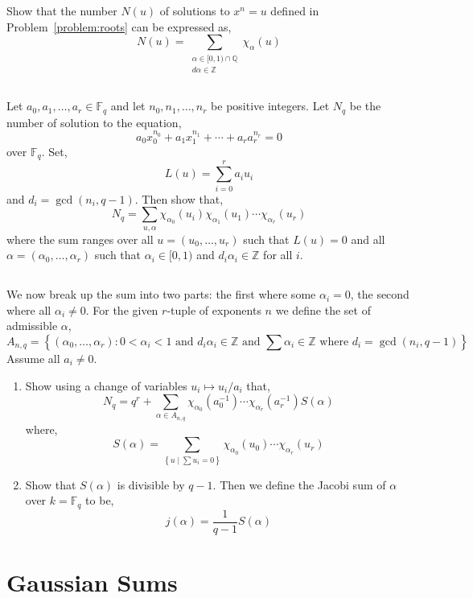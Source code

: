 \documentclass[12pt]{article}
\newcommand{\Z}{\mathbb{Z}}
\newcommand{\ZZ}{\mathbb{Z}}
\newcommand{\QQ}{\mathbb{Q}}
\newcommand{\FF}{\mathbb{F}}
\theoremstyle{remark}
\theoremstyle{definition}
\begin{document}
Show that the number $N(u)$ of solutions to $x^n = u$ defined in Problem~\ref{problem:roots} can be expressed as,
\[ N(u) = \sum_{\substack{ \alpha \in [0,1) \cap \QQ \\ 
d \alpha \in \ZZ }} \chi_{\alpha}(u) \]

\subsection{}

Let $a_0, a_1, \dots, a_r \in \FF_q$ and let $n_0, n_1, \dots, n_r$ be positive integers. Let $N_q$ be the number of solution to the equation,
\[ a_0 x_0^{n_0} + a_1 x_1^{n_1} + \cdots + a_r a_r^{n_r} = 0 \]
over $\FF_q$. Set,
\[ L(u) = \sum_{i = 0}^r a_i u_i \]
and $d_i = \gcd(n_i, q-1)$. Then show that,
\[ N_q = \sum_{u, \alpha} \chi_{\alpha_0}(u_i) \chi_{\alpha_1}(u_1) \cdots \chi_{\alpha_r}(u_r) \]
where the sum ranges over all $u = (u_0, \dots, u_r)$ such that $L(u) = 0$ and all $\alpha = (\alpha_0, \dots, \alpha_r)$ such that $\alpha_i \in [0,1)$ and $d_i \alpha_i \in \ZZ$ for all $i$.

\subsection{}

We now break up the sum into two parts: the first where some $\alpha_i = 0$, the second where all $\alpha_i \neq 0$. For the given $r$-tuple of exponents $n$ we define the set of admissible $\alpha$,
\[ A_{n, q} = \left\{ (\alpha_0, \dots, \alpha_r) : 0 < \alpha_i < 1 \text{ and } d_i \alpha_i \in \Z \text{ and } \sum \alpha_i \in \Z \text{ where } d_i = \gcd{(n_i, q-1)} \right\} \]
Assume all $a_i \neq 0$. 
\begin{enumerate}
\item Show using a change of variables $u_i \mapsto u_i / a_i$ that,
\[ N_q = q^r + \sum_{\alpha \in A_{n,q}} \chi_{\alpha_0}(a_0^{-1}) \cdots \chi_{\alpha_r}(a_r^{-1}) S(\alpha) \]
where,
\[ S(\alpha) = \sum_{\left\{ u \middle| \sum u_i = 0 \right\}} \chi_{\alpha_0}(u_0) \cdots \chi_{\alpha_r}(u_r) \]

\item Show that $S(\alpha)$ is divisible by $q-1$. Then we define the Jacobi sum of $\alpha$ over $k = \FF_q$ to be,
\[ j(\alpha) = \frac{1}{q-1} S(\alpha) \]
\end{enumerate}


\section{Gaussian Sums} 
\end{document}
